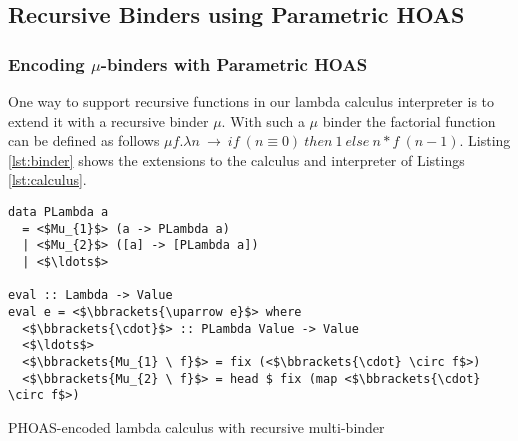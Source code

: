 \subsection{Recursive Binders using Parametric HOAS}\label{subsec:recursive}

\subsubsection{Encoding $\mu$-binders with Parametric HOAS}
\label{subsubsec:binder}

One way to support recursive functions in our lambda calculus interpreter is to extend it with a recursive binder $\mu$. With such a $\mu$ binder the factorial function can be defined as follows $\mu f. \lambda n \ \to \ if \ (n \equiv 0) \ then \ 1 \ else \ n * f \ (n - 1)$. Listing \ref{lst:binder} shows the extensions to the calculus and interpreter of Listings \ref{lst:calculus}.

\begin{listing}[H]
\begin{verbatim}
data PLambda a
  = <$Mu_{1}$> (a -> PLambda a)
  | <$Mu_{2}$> ([a] -> [PLambda a])
  | <$\ldots$>

eval :: Lambda -> Value
eval e = <$\bbrackets{\uparrow e}$> where
  <$\bbrackets{\cdot}$> :: PLambda Value -> Value
  <$\ldots$>
  <$\bbrackets{Mu_{1} \ f}$> = fix (<$\bbrackets{\cdot} \circ f$>)
  <$\bbrackets{Mu_{2} \ f}$> = head $ fix (map <$\bbrackets{\cdot} \circ f$>)

\end{verbatim}
\caption{PHOAS-encoded lambda calculus with recursive multi-binder}
\label{lst:binder}
\end{listing}

